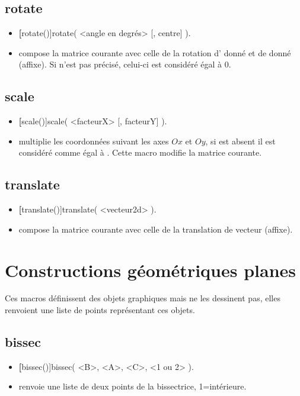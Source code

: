 \subsection{rotate}
\begin{itemize}
 \item \util \textbf[rotate()]{rotate( <angle en degrés> [, centre] )}.
 \item \desc compose la matrice courante avec celle de la rotation d’ donné et de  donné (affixe). Si  n'est pas précisé, celui-ci est considéré égal à $0$.
\end{itemize}

\subsection{scale}
\begin{itemize}
 \item \util \textbf[scale()]{scale( <facteurX> [, facteurY] )}.
 \item \desc multiplie les coordonnées suivant les axes $Ox$ et $Oy$, si  est absent il est considéré comme égal à . Cette macro modifie la matrice courante.
\end{itemize}

\subsection{translate}
\begin{itemize}
 \item \util \textbf[translate()]{translate( <vecteur2d> )}.
 \item \desc compose la matrice courante avec celle de la translation de vecteur  (affixe).
\end{itemize}


\section{Constructions géométriques planes}

Ces macros définissent des objets graphiques mais ne les dessinent pas, elles renvoient une liste de points représentant ces objets.

\subsection{bissec}
\begin{itemize}
 \item \util \textbf[bissec()]{bissec( <B>, <A>, <C>, <1 ou 2> )}.
 \item \desc renvoie une liste de deux points de la bissectrice, 1=intérieure.
\end{itemize}

